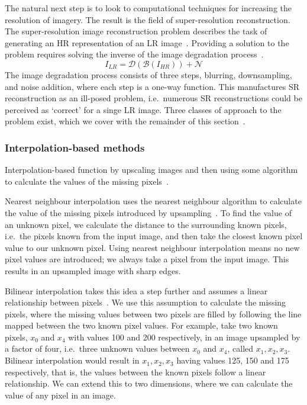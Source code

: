 The natural next step is to look to computational techniques for increasing the resolution of imagery. The result is the field of super-resolution reconstruction. The super-resolution image reconstruction problem describes the task of generating an HR representation of an LR image~\cite{ref}. Providing a solution to the problem requires solving the inverse of the image degradation process~\cite{imageDeg}.
\[I_{LR} = \mathcal{D}(\mathcal{B}(I_{HR})) + \mathcal{N}\]
The image degradation process consists of three steps, blurring, downsampling, and noise addition, where each step is a one-way function. This manufactures SR reconstruction as an ill-posed problem, i.e.\ numerous SR reconstructions could be perceived as `correct' for a singe LR image. Three classes of approach to the problem exist, which we cover with the remainder of this section~\cite{superResRemoteSensingOverview}.

\subsubsection{Interpolation-based methods}
Interpolation-based function by upscaling images and then using some algorithm to calculate the values of the missing pixels~\cite{interpolation}.

Nearest neighbour interpolation uses the nearest neighbour algorithm to calculate the value of the missing pixels introduced by upsampling~\cite{nnInterpolation}. To find the value of an unknown pixel, we calculate the distance to the surrounding known pixels, i.e.\ the pixels known from the input image, and then take the closest known pixel value to our unknown pixel. Using nearest neighbour interpolation means no new pixel values are introduced; we always take a pixel from the input image. This results in an upsampled image with sharp edges.

Bilinear interpolation takes this idea a step further and assumes a linear relationship between pixels~\cite{bilnearInterpolation}. We use this assumption to calculate the missing pixels, where the missing values between two pixels are filled by following the line mapped between the two known pixel values. For example, take two known pixels, $x_0$ and $x_4$ with values 100 and 200 respectively, in an image upsampled by a factor of four, i.e.\ three unknown values between $x_0$ and $x_4$, called $x_1, x_2, x_3$. Bilinear interpolation would result in $x_1, x_2, x_3$ having values 125, 150 and 175 respectively, that is, the values between the known pixels follow a linear relationship. We can extend this to two dimensions, where we can calculate the value of any pixel in an image.

